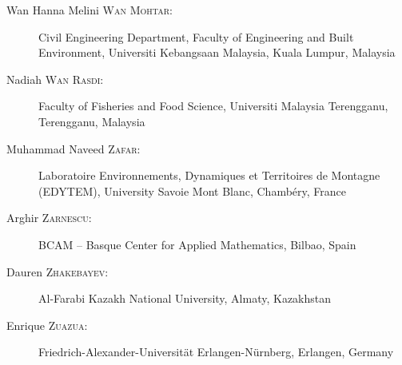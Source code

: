\begin{description}
  \item[Wan Hanna Melini \textsc{Wan Mohtar}:] Civil Engineering Department, Faculty of Engineering and Built Environment, Universiti Kebangsaan Malaysia, Kuala Lumpur, Malaysia
  \item[Nadiah \textsc{Wan Rasdi}:] Faculty of Fisheries and Food Science, Universiti Malaysia Terengganu, Terengganu, Malaysia
  \item[Muhammad Naveed \textsc{Zafar}:] Laboratoire Environnements, Dynamiques et Territoires de Montagne (EDYTEM), University Savoie Mont Blanc, Chamb\'ery, France 
  \item[Arghir \textsc{Zarnescu}:] BCAM -- Basque Center for Applied Mathematics, Bilbao, Spain
  \item[Dauren \textsc{Zhakebayev}:] Al-Farabi Kazakh National University, Almaty, Kazakhstan
  \item[Enrique \textsc{Zuazua}:] Friedrich-Alexander-Universität Erlangen-Nürnberg, Erlangen, Germany

\end{description}